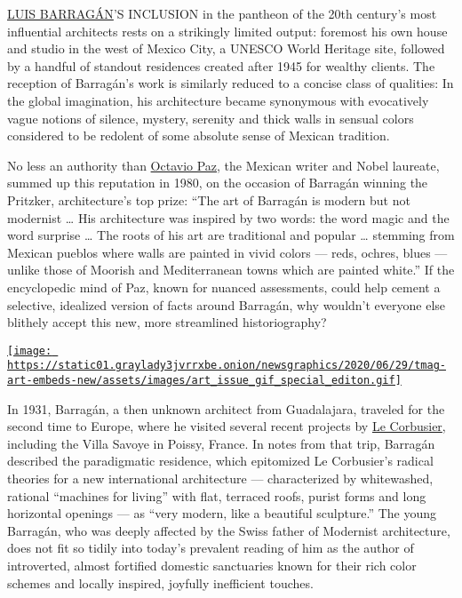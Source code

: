 \href{https://www.nytimes3xbfgragh.onion/2014/06/15/travel/finding-mexico-city-and-luis-barragan-again.html}{LUIS
BARRAGÁN}'S INCLUSION in the pantheon of the 20th century's most
influential architects rests on a strikingly limited output: foremost
his own house and studio in the west of Mexico City, a UNESCO World
Heritage site, followed by a handful of standout residences created
after 1945 for wealthy clients. The reception of Barragán's work is
similarly reduced to a concise class of qualities: In the global
imagination, his architecture became synonymous with evocatively vague
notions of silence, mystery, serenity and thick walls in sensual colors
considered to be redolent of some absolute sense of Mexican tradition.

No less an authority than
\href{https://www.nytimes3xbfgragh.onion/1998/04/21/books/octavio-paz-mexico-s-man-of-letters-dies-at-84.html}{Octavio
Paz}, the Mexican writer and Nobel laureate, summed up this reputation
in 1980, on the occasion of Barragán winning the Pritzker,
architecture's top prize: ``The art of Barragán is modern but not
modernist \ldots{} His architecture was inspired by two words: the word
magic and the word surprise \ldots{} The roots of his art are
traditional and popular \ldots{} stemming from Mexican pueblos where
walls are painted in vivid colors --- reds, ochres, blues --- unlike
those of Moorish and Mediterranean towns which are painted white.'' If
the encyclopedic mind of Paz, known for nuanced assessments, could help
cement a selective, idealized version of facts around Barragán, why
wouldn't everyone else blithely accept this new, more streamlined
historiography?

\href{https://www.nytimes3xbfgragh.onion/issue/t-magazine/2020/07/02/true-believers-art-issue}{\texttt{[image: https://static01.graylady3jvrrxbe.onion/newsgraphics/2020/06/29/tmag-art-embeds-new/assets/images/art\_issue\_gif\_special\_editon.gif]}}

In 1931, Barragán, a then unknown architect from Guadalajara, traveled
for the second time to Europe, where he visited several recent projects
by
\href{https://www.nytimes3xbfgragh.onion/topic/person/le-corbusier}{Le
Corbusier}, including the Villa Savoye in Poissy, France. In notes from
that trip, Barragán described the paradigmatic residence, which
epitomized Le Corbusier's radical theories for a new international
architecture --- characterized by whitewashed, rational ``machines for
living'' with flat, terraced roofs, purist forms and long horizontal
openings --- as ``very modern, like a beautiful sculpture.'' The young
Barragán, who was deeply affected by the Swiss father of Modernist
architecture, does not fit so tidily into today's prevalent reading of
him as the author of introverted, almost fortified domestic sanctuaries
known for their rich color schemes and locally inspired, joyfully
inefficient touches.

